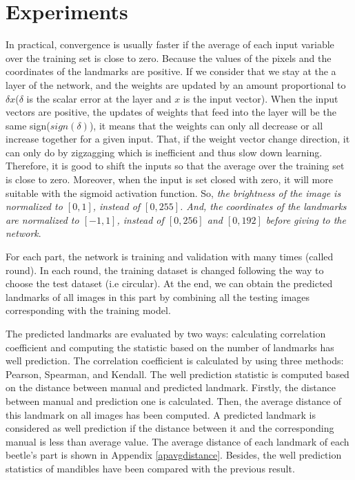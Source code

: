\documentclass[12pt,a4paper]{article}
\begin{document}
\section{Experiments}
In practical, convergence is usually faster if the average of each input variable over the training set is close to zero. Because the values of the pixels and the coordinates of the landmarks are positive. If we consider that we stay at the a layer of the network, and the weights are updated by an amount proportional to $\delta x$($\delta$ is the scalar error at the layer and $x$ is the input vector). When the input vectors are positive, the updates of weights that feed into the layer will be the same sign($sign(\delta)$), it means that the weights can only all decrease or all increase together for a given input. That, if the weight vector change direction, it can only do by zigzagging which is inefficient and thus slow down learning. Therefore, it is good to shift the inputs so that the average over the training set is close to zero. Moreover, when the input is set closed with zero, it will more suitable with the sigmoid activation function\cite{lecun2012efficient}. So, \textit{the brightness of the image is normalized to $[0,1]$, instead of $[0,255]$. And, the coordinates of the landmarks are normalized to $[-1,1]$, instead of $[0,256]$ and $[0,192]$ before giving to the network}.

For each part, the network is training and validation with many times (called round). In each round, the training dataset is changed following the way to choose the test dataset (i.e circular). At the end, we can obtain the predicted landmarks of all images in this part by combining all the  testing images corresponding with the training model. 

The predicted landmarks are evaluated by two ways: calculating correlation coefficient and computing the statistic based on the number of landmarks has well prediction.
The correlation coefficient is calculated by using three methods: Pearson\cite{pallant2013spss}, Spearman\cite{myers2010research}, and Kendall\cite{kendall1938new}. The well prediction statistic is computed based on the distance between manual and predicted landmark. Firstly, the distance between manual and prediction one is calculated. Then, the average distance of this landmark on all images has been computed. A predicted landmark is considered as well prediction if the distance between it and the corresponding manual is less than average value. The average distance of each landmark of each beetle's part is shown in Appendix \ref{apavgdistance}. Besides, the well prediction statistics of mandibles have been compared with the previous result\cite{le:hal-01571440}.
\end{document}
